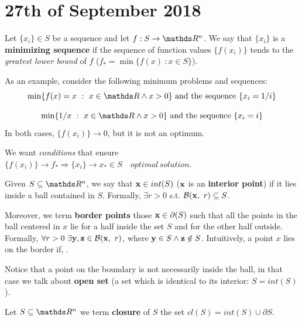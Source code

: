 \documentclass[computationalMathematics.tex]{subfiles}
\begin{document}
\chapter{27th of September 2018}


\begin{definition}
	Let $\{x_i\} \in S$ be a sequence and let $f : S \to \R^n$.
	We say that $\{x_i\}$ is a \textbf{minimizing sequence} if the sequence of function values $\{f(x_i)\}$ tends to the \emph{greatest lower bound} of $f$ ($f_* = \min \{f(x)~:x \in S\}$).
\end{definition}

\begin{example}
As an example, consider the following minimum problems and sequences:
	\[
		\min \{f(x) = x~:~x \in \R \wedge x > 0\} \text{ and the sequence } \{x_i = 1/i\} 
	\]

	\[
		\min \{1/x~:~x \in \R \wedge x > 0\} \text{ and the sequence } \{x_i = i\}
	\]
	In both cases, $\{f(x_i)\} \to 0$, but it is not an optimum.
\end{example}

\noindent We want \emph{conditions} that ensure $\{f(x_i)\} \to f_* \Rightarrow \{x_i\}\to x_* \in S \quad optimal \, solution$.

\begin{definition}
  Given $S \subseteq \R^n$, we say that ${\bf x } \in int(S)$ (${\bf x }$ is an \textbf{interior point}) if it lies inside a ball contained in $S$.
  Formally, $\exists r > 0$ s.t. $\mathcal{B}({\bf x },~r) \subseteq S$.

  Moreover, we term \textbf{border points} those ${\bf x } \in \partial(S)$ such that all the points in the ball centered in $x$ lie for a half inside the set $S$ and for the other half outside.
  Formally, $\forall r > 0~\exists {\bf y },{\bf z } \in \mathcal{B}({\bf x },~r)$, where ${\bf y } \in S \wedge {\bf z } \notin S$.
  Intuitively, a point $x$ lies on the border if, . 
\end{definition}

Notice that a point on the boundary is not necessarily inside the ball, in that case we talk about \textbf{open set} (a set which is identical to its interior: $S = int(S)$).

\begin{definition}
  Let $S \subseteq \R^n$ we term \textbf{closure} of $S$ the set $cl(S) = int(S) \cup \partial S$.
\end{definition}
\end{document}
